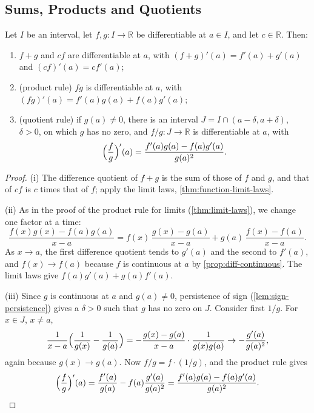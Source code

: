 \subsection{Sums, Products and Quotients}

\begin{theorem}
\label{thm:diff-algebra}
Let $I$ be an interval, let $f,g\colon I\to\mathbb R$ be differentiable at $a\in I$, and let $c\in\mathbb R$. Then:
\begin{enumerate}
\item $f+g$ and $cf$ are differentiable at $a$, with $(f+g)'(a)=f'(a)+g'(a)$ and $(cf)'(a)=cf'(a)$;
\item (product rule) $fg$ is differentiable at $a$, with $(fg)'(a)=f'(a)g(a)+f(a)g'(a)$;
\item (quotient rule) if $g(a)\ne0$, there is an interval $J=I\cap(a-\delta,a+\delta)$, $\delta>0$, on which $g$ has no zero, and $f/g\colon J\to\mathbb R$ is differentiable at $a$, with
\[
\Bigl(\frac fg\Bigr)'(a)=\frac{f'(a)g(a)-f(a)g'(a)}{g(a)^2} .
\]
\end{enumerate}
\end{theorem}

\begin{proof}
(i) The difference quotient of $f+g$ is the sum of those of $f$ and $g$, and that of $cf$ is $c$ times that of $f$; apply the limit laws, \cref{thm:function-limit-laws}.

(ii) As in the proof of the product rule for limits (\cref{thm:limit-laws}), we change one factor at a time:
\[
\frac{f(x)g(x)-f(a)g(a)}{x-a}=f(x)\,\frac{g(x)-g(a)}{x-a}+g(a)\,\frac{f(x)-f(a)}{x-a}.
\]
As $x\to a$, the first difference quotient tends to $g'(a)$ and the second to $f'(a)$, and $f(x)\to f(a)$ because $f$ is continuous at $a$ by \cref{prop:diff-continuous}. The limit laws give $f(a)g'(a)+g(a)f'(a)$.

(iii) Since $g$ is continuous at $a$ and $g(a)\ne0$, persistence of sign (\cref{lem:sign-persistence}) gives a $\delta>0$ such that $g$ has no zero on $J$. Consider first $1/g$. For $x\in J$, $x\ne a$,
\[
\frac1{x-a}\Bigl(\frac1{g(x)}-\frac1{g(a)}\Bigr)=-\frac{g(x)-g(a)}{x-a}\cdot\frac1{g(x)g(a)}\to-\frac{g'(a)}{g(a)^2},
\]
again because $g(x)\to g(a)$. Now $f/g=f\cdot(1/g)$, and the product rule gives
\[
\Bigl(\frac fg\Bigr)'(a)=\frac{f'(a)}{g(a)}-f(a)\frac{g'(a)}{g(a)^2}=\frac{f'(a)g(a)-f(a)g'(a)}{g(a)^2} .
\]
\end{proof}

